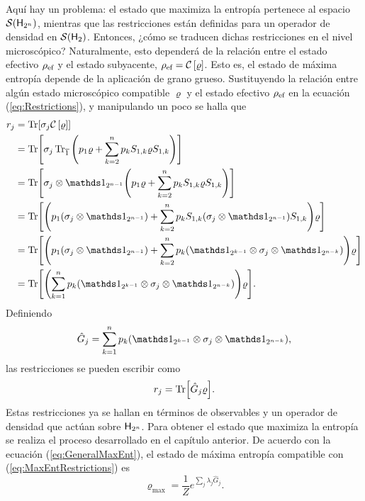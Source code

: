Aquí hay un problema: el estado que maximiza la entropía pertenece al espacio $\mathcal{S}({\sf H}_{2^{n}})$, mientras que las restricciones están definidas para un operador de densidad en $\mathcal{S}({\sf H}_{2})$. Entonces, ¿cómo se traducen dichas restricciones en el nivel microscópico? Naturalmente, esto dependerá de la relación entre el estado efectivo $\rho_{\text{ef}}$ y el estado subyacente, $\rho_{\text{ef}}=\mathcal{C}\left[\varrho\right]$. Esto es, el estado de máxima entropía depende de la aplicación de grano grueso. Sustituyendo la relación entre algún estado microscópico compatible $\varrho$ y el estado efectivo $\rho_{\text{ef}}$ en la ecuación (\ref{eq:Restrictions}), y manipulando un poco se halla que
\begin{align}
    r_{j}&=\Tr[\sigma_{j}\CG{\varrho}]\nonumber\\
    &=\Tr[\sigma_{j}\Tr_{\overline{1}}\qty(p_{1}\varrho+\sum_{k=2}^{n}p_{k}S_{1,k}\varrho S_{1,k})]\nonumber\\
    &=\Tr[\sigma_{j}\otimes\Id_{2^{n-1}}\qty(p_{1}\varrho+\sum_{k=2}^{n}p_{k}S_{1,k}\varrho S_{1,k})]\nonumber\\
    &=\Tr[\qty(p_{1}(\sigma_{j}\otimes\Id_{2^{n-1}})+\sum_{k=2}^{n}p_{k}S_{1,k}(\sigma_{j}\otimes\Id_{2^{n-1}})S_{1,k})\varrho]\nonumber\\
    &=\Tr[\qty(p_{1}(\sigma_{j}\otimes\Id_{2^{n-1}})+\sum_{k=2}^{n}p_{k}(\Id_{2^{k-1}}\otimes\sigma_{j}\otimes\Id_{2^{n-k}}))\varrho]\nonumber\\
    &=\Tr[\qty(\sum_{k=1}^{n}p_{k}(\Id_{2^{k-1}}\otimes\sigma_{j}\otimes\Id_{2^{n-k}}))\varrho]\nonumber.
\end{align}
Definiendo
\begin{equation}\label{eq:GhatNM}
    \hat{G}_{j}=\sum_{k=1}^{n}p_{k}(\Id_{2^{k-1}}\otimes\sigma_{j}\otimes\Id_{2^{n-k}}),
\end{equation}
las restricciones se pueden escribir como
\begin{equation}\label{eq:MaxEntRestrictions}
    r_{j}=\Tr[\hat{G}_{j}\varrho].
\end{equation}
Estas restricciones ya se hallan en términos de observables y un operador de densidad que actúan sobre ${\sf H}_{2^{n}}$. Para obtener el estado que maximiza la entropía se realiza el proceso desarrollado en el capítulo anterior. De acuerdo con la ecuación (\ref{eq:GeneralMaxEnt}), el estado de máxima entropía compatible con (\ref{eq:MaxEntRestrictions}) es
\begin{equation}\label{eq:MaxEntLagMult}
    \varrho_{\max}=\frac{1}{Z}e^{\sum_{j}\lambda_{j}\hat{G}_{j}}.
\end{equation}
